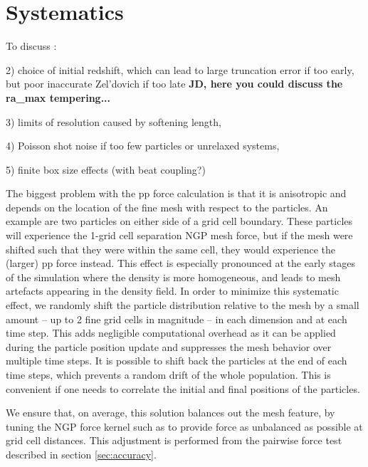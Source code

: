 \section{Systematics}
\label{sec:systematics}

To discuss : 

2) choice of initial redshift, which can lead to large truncation error if too early, but poor inaccurate Zel'dovich if too late 
{\bf JD, here you could discuss the ra\_max tempering...} 

3) limits of resolution caused by softening length,

4) Poisson shot noise if too few particles or unrelaxed systems, 

5) finite box size effects (with beat coupling?)
 

The biggest problem with the pp force calculation is that it 
is anisotropic and depends on the location of the fine mesh with respect 
to the particles. An example are two particles on either side of a grid 
cell boundary. These particles will experience the 1-grid cell separation
NGP mesh force, but if the mesh were shifted such that they were
within the same cell, they would experience the (larger) pp force instead. 
This effect is especially pronounced at the early stages of the simulation where
the density is more homogeneous, and leads to mesh artefacts appearing
in the density field. In order to minimize this systematic effect, 
we randomly shift the particle distribution relative to the mesh by a small
amount -- up to 2 fine grid cells in magnitude -- in each
dimension and at each time step.  This adds negligible computational
overhead as it can be applied during the particle position update
and suppresses the mesh behavior over multiple time steps.
It is possible to shift back the particles at the end of each time steps,
which prevents a random drift of the whole population.
This is convenient if one needs to correlate the initial and final positions of the particles.
 
We ensure that, on average, this solution balances out the mesh feature,
by tuning the NGP force kernel such as to provide  force as unbalanced as possible at grid cell distances.
This adjustment is performed from the pairwise force test described in section \ref{sec:accuracy}.
